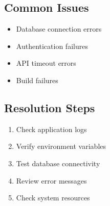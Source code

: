 \subsection{Common Issues}
\begin{itemize}
    \item Database connection errors
    \item Authentication failures
    \item API timeout errors
    \item Build failures
\end{itemize}

\subsection{Resolution Steps}
\begin{enumerate}
    \item Check application logs
    \item Verify environment variables
    \item Test database connectivity
    \item Review error messages
    \item Check system resources
\end{enumerate} 
